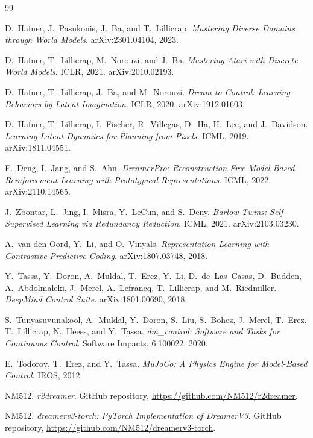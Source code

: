 \documentclass[11pt]{article}
\begin{document}
\begin{thebibliography}{99}

 D.~Hafner, J.~Pasukonis, J.~Ba, and T.~Lillicrap.
\emph{Mastering Diverse Domains through World Models}. arXiv:2301.04104, 2023.

 D.~Hafner, T.~Lillicrap, M.~Norouzi, and J.~Ba.
\emph{Mastering Atari with Discrete World Models}. ICLR, 2021.
arXiv:2010.02193.

 D.~Hafner, T.~Lillicrap, J.~Ba, and M.~Norouzi.
\emph{Dream to Control: Learning Behaviors by Latent Imagination}. ICLR, 2020.
arXiv:1912.01603.

 D.~Hafner, T.~Lillicrap, I.~Fischer, R.~Villegas, D.~Ha,
H.~Lee, and J.~Davidson. \emph{Learning Latent Dynamics for Planning from
Pixels}. ICML, 2019. arXiv:1811.04551.

 F.~Deng, I.~Jang, and S.~Ahn. \emph{DreamerPro:
Reconstruction-Free Model-Based Reinforcement Learning with Prototypical
Representations}. ICML, 2022. arXiv:2110.14565.

 J.~Zbontar, L.~Jing, I.~Misra, Y.~LeCun, and S.~Deny.
\emph{Barlow Twins: Self-Supervised Learning via Redundancy Reduction}. ICML,
2021. arXiv:2103.03230.

 A.~van den Oord, Y.~Li, and O.~Vinyals.
\emph{Representation Learning with Contrastive Predictive Coding}.
arXiv:1807.03748, 2018.

 Y.~Tassa, Y.~Doron, A.~Muldal, T.~Erez, Y.~Li, D.~de~Las~Casas,
D.~Budden, A.~Abdolmaleki, J.~Merel, A.~Lefrancq, T.~Lillicrap, and
M.~Riedmiller. \emph{DeepMind Control Suite}. arXiv:1801.00690, 2018.

 S.~Tunyasuvunakool, A.~Muldal, Y.~Doron, S.~Liu, S.~Bohez,
J.~Merel, T.~Erez, T.~Lillicrap, N.~Heess, and Y.~Tassa.
\emph{dm\_control: Software and Tasks for Continuous Control}.
Software Impacts, 6:100022, 2020.

 E.~Todorov, T.~Erez, and Y.~Tassa.
\emph{MuJoCo: A Physics Engine for Model-Based Control}. IROS, 2012.

 NM512. \emph{r2dreamer}. GitHub repository,
\url{https://github.com/NM512/r2dreamer}.

 NM512. \emph{dreamerv3-torch: PyTorch Implementation of
DreamerV3}. GitHub repository, \url{https://github.com/NM512/dreamerv3-torch}.

\end{thebibliography}
\end{document}

